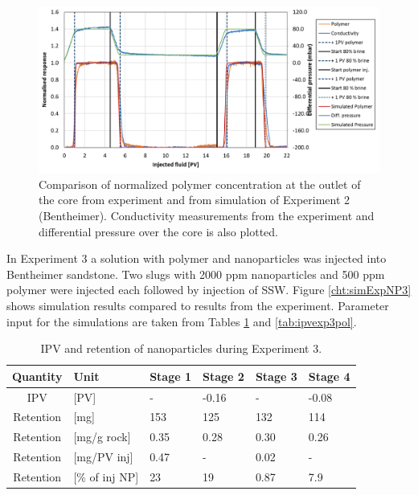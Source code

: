 \documentclass[nanomaterials,article,submit,moreauthors,pdftex]{Definitions/mdpi}
\begin{document}
\begin{figure}[h!]
    \centering
    \includegraphics[width=.8\textwidth]{fig/simExpNP2.png}
    \caption{Comparison of normalized polymer concentration at the outlet of the core from experiment and from simulation of Experiment 2 (Bentheimer). Conductivity measurements from the experiment and differential pressure over the core is also plotted.}
    \label{cht:simExpNP2}
\end{figure}

In Experiment 3 a solution with polymer and nanoparticles was injected into Bentheimer sandstone. Two slugs with 2000 ppm nanoparticles and 500 ppm polymer were injected each followed by injection of SSW. Figure \ref{cht:simExpNP3} shows simulation results compared to results from the experiment. Parameter input for the simulations are taken from Tables \ref{tab:ipvexp3} and \ref{tab:ipvexp3pol}.

\begin{table}[h!] 
\small
\centering
\caption{IPV and retention of nanoparticles during Experiment 3.}
\label{tab:ipvexp3}
\begin{tabular}{c l l l l l } 
\toprule
\textbf{Quantity} & \textbf{Unit} & \textbf{Stage 1} & \textbf{Stage 2} & \textbf{Stage 3} & \textbf{Stage 4} \\ 
\midrule 
IPV         & [PV]          & -         & -0.16     & -         & -0.08     \\
Retention   & [mg]          & 153       & 125       & 132       & 114       \\ 
Retention   & [mg/g rock]   & 0.35      & 0.28     & 0.30     & 0.26     \\ 
Retention   & [mg/PV inj]   & 0.47      & -         & 0.02      & -         \\
Retention   & [\% of inj NP]& 23        & 19       & 0.87       & 7.9       \\ 
\bottomrule
\end{tabular}
\end{table}
\end{document}
